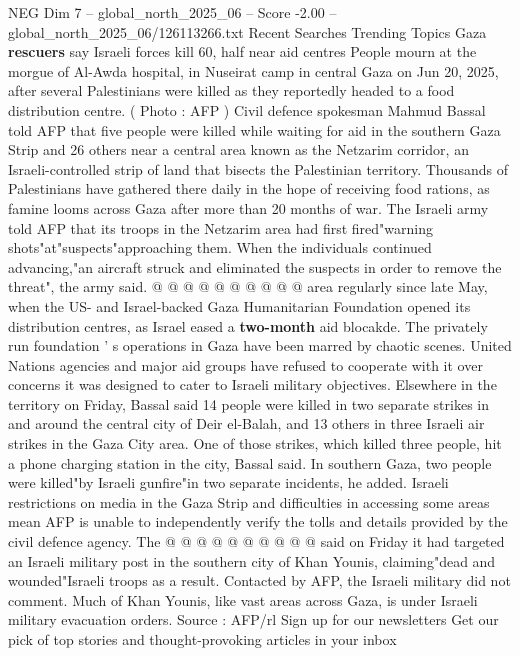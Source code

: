 \begin{textsample}{NEG Dim 7 – global\_north\_2025\_06 – Score -2.00 – global\_north\_2025\_06/126113266.txt}  \label{ex:f7_neg_073}
Recent Searches Trending Topics Gaza \textbf{rescuers} say Israeli forces kill 60, half near aid centres People mourn at the morgue of Al-Awda hospital, in Nuseirat camp in central Gaza on Jun 20, 2025, after several Palestinians were killed as they reportedly headed to a food distribution centre. ( Photo : AFP ) Civil defence spokesman Mahmud Bassal told AFP that five people were killed while waiting for aid in the southern Gaza Strip and 26 others near a central area known as the Netzarim corridor, an Israeli-controlled strip of land that bisects the Palestinian territory.
Thousands of Palestinians have gathered there daily in the hope of receiving food rations, as famine looms across Gaza after more than 20 months of war.
The Israeli army told AFP that its troops in the Netzarim area had first fired"warning shots"at"suspects"approaching them.
When the individuals continued advancing,"an aircraft struck and eliminated the suspects in order to remove the threat", the army said. @ @ @ @ @ @ @ @ @ @ area regularly since late May, when the US- and Israel-backed Gaza Humanitarian Foundation opened its distribution centres, as Israel eased a \textbf{two-month} aid blocakde.
The privately run foundation ' s operations in Gaza have been marred by chaotic scenes.
United Nations agencies and major aid groups have refused to cooperate with it over concerns it was designed to cater to Israeli military objectives.
Elsewhere in the territory on Friday, Bassal said 14 people were killed in two separate strikes in and around the central city of Deir el-Balah, and 13 others in three Israeli air strikes in the Gaza City area.
One of those strikes, which killed three people, hit a phone charging station in the city, Bassal said.
In southern Gaza, two people were killed"by Israeli gunfire"in two separate incidents, he added.
Israeli restrictions on media in the Gaza Strip and difficulties in accessing some areas mean AFP is unable to independently verify the tolls and details provided by the civil defence agency.
The @ @ @ @ @ @ @ @ @ @ said on Friday it had targeted an Israeli military post in the southern city of Khan Younis, claiming"dead and wounded"Israeli troops as a result.
Contacted by AFP, the Israeli military did not comment.
Much of Khan Younis, like vast areas across Gaza, is under Israeli military evacuation orders.
Source : AFP/rl Sign up for our newsletters Get our pick of top stories and thought-provoking articles in your inbox

\end{textsample}
